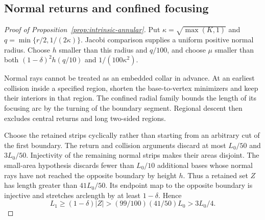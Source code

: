 \subsection{Normal returns and confined focusing}
\label{sec:annular-confined-focusing}

\begin{proof}[Proof of Proposition~\ref{prop:intrinsic-annular}]
Put $\kappa=\sqrt{\max(K,1)}$ and
$q=\min\{r/2,1/(2\kappa)\}$. Jacobi comparison supplies a
uniform positive normal radius. Choose $h$ smaller than this
radius and $q/100$, and choose $\mu$ smaller than both
$(1-\delta)^2h(q/10)$ and $1/(100\kappa^2)$.

Normal rays cannot be treated as an embedded collar in advance.
At an earliest collision inside a specified region, shorten the
base-to-vertex minimizers and keep their interiors in that region.
The confined radial family bounds the length of its focusing
arc by the turning of the boundary segment. Regional descent
then excludes central returns and long two-sided regions.

Choose the retained strips cyclically rather than starting from an
arbitrary cut of the first boundary. The return and collision
arguments discard at most $L_0/50$ and $3L_0/50$. Injectivity of the
remaining normal strips makes their areas disjoint. The small-area
hypothesis discards fewer than $L_0/10$ additional bases whose
normal rays have not reached the opposite boundary by height $h$.
Thus a retained set $Z$ has length greater than $41L_0/50$.
Its endpoint map to the opposite boundary is injective and
stretches arclength by at least $1-\delta$. Hence
\[
 L_1\geq(1-\delta)|Z|>
       (99/100)(41/50)L_0>3L_0/4.
\]
\end{proof}


